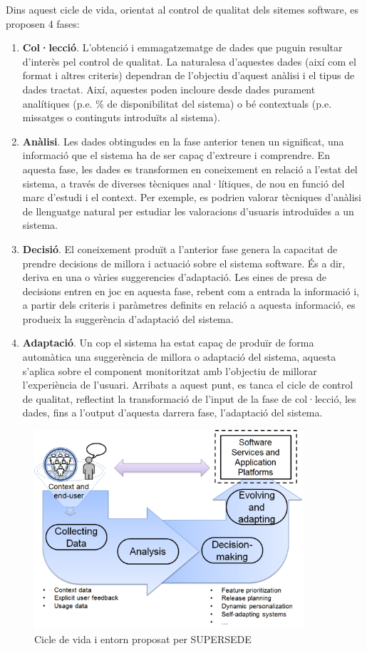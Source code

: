 Dins aquest cicle de vida, orientat al control de qualitat dels sitemes software, es proposen 4 fases:

\begin{enumerate}
\item \textbf{Col·lecció}. L'obtenció i emmagatzematge de dades que puguin resultar d'interès pel control de qualitat. La naturalesa d'aquestes dades (així com el format i altres criteris) dependran de l'objectiu d'aquest anàlisi i el tipus de dades tractat. Així, aquestes poden incloure desde dades purament analítiques (p.e. \% de disponibilitat del sistema) o bé contextuals (p.e. missatges o continguts introduïts al sistema).
\item \textbf{Anàlisi}. Les dades obtingudes en la fase anterior tenen un significat, una informació que el sistema ha de ser capaç d'extreure i comprendre. En aquesta fase, les dades es transformen en coneixement en relació a l'estat del sistema, a través de diverses tècniques anal·lítiques, de nou en funció del marc d'estudi i el context. Per exemple, es podrien valorar tècniques d'anàlisi de llenguatge natural per estudiar les valoracions d'usuaris introduïdes a un sistema.
\item \textbf{Decisió}. El coneixement produït a l'anterior fase genera la capacitat de prendre decisions de millora i actuació sobre el sistema software. És a dir, deriva en una o vàries suggerencies d'adaptació. Les eines de presa de decisions entren en joc en aquesta fase, rebent com a entrada la informació i, a partir dels criteris i paràmetres definits en relació a aquesta informació, es produeix la suggerència d'adaptació del sistema.
\item \textbf{Adaptació}. Un cop el sistema ha estat capaç de produïr de forma automàtica una suggerència de millora o adaptació del sistema, aquesta s'aplica sobre el component monitoritzat amb l'objectiu de millorar l'experiència de l'usuari. Arribats a aquest punt, es tanca el cicle de control de qualitat, reflectint la transformació de l'input de la fase de col·lecció, les dades, fins a l'output d'aquesta darrera fase, l'adaptació del sistema.
\end{enumerate}

\begin{figure}
\centering
\includegraphics[width=10cm]{Figures/Figure2}
\decoRule
\caption[Cicle de vida i entorn proposat per SUPERSEDE]{Cicle de vida i entorn proposat per SUPERSEDE}
\label{fig:Figura1}
\end{figure}

